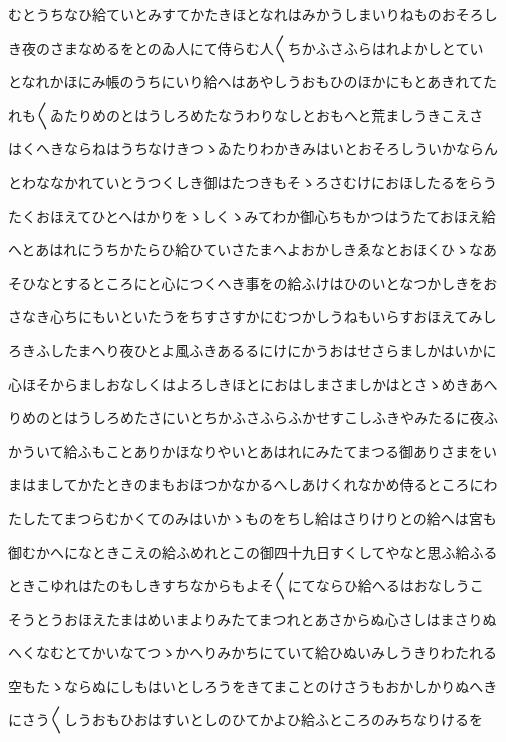 \documentclass[a4paper,11pt,landscape]{ltjtarticle}
\begin{document}
むとうちなひ給ていとみすてかたきほとなれはみかうしまいりねものおそろし
\par\medskip
き夜のさまなめるをとのゐ人にて侍らむ人〱ちかふさふらはれよかしとてい
\par\medskip
となれかほにみ帳のうちにいり給へはあやしうおもひのほかにもとあきれてた
\par\medskip
れも〱ゐたりめのとはうしろめたなうわりなしとおもへと荒ましうきこえさ
\par\medskip
はくへきならねはうちなけきつゝゐたりわかきみはいとおそろしういかならん
\par\medskip
とわななかれていとうつくしき御はたつきもそゝろさむけにおほしたるをらう
\par\medskip
たくおほえてひとへはかりをゝしくゝみてわか御心ちもかつはうたておほえ給
\par\medskip
へとあはれにうちかたらひ給ひていさたまへよおかしきゑなとおほくひゝなあ
\par\medskip
そひなとするところにと心につくへき事をの給ふけはひのいとなつかしきをお
\par\medskip
さなき心ちにもいといたうをちすさすかにむつかしうねもいらすおほえてみし
\par\medskip
ろきふしたまへり夜ひとよ風ふきあるるにけにかうおはせさらましかはいかに
\par\medskip
心ほそからましおなしくはよろしきほとにおはしまさましかはとさゝめきあへ
\par\medskip
りめのとはうしろめたさにいとちかふさふらふかせすこしふきやみたるに夜ふ
\par\medskip
かういて給ふもことありかほなりやいとあはれにみたてまつる御ありさまをい
\par\medskip
まはましてかたときのまもおほつかなかるへしあけくれなかめ侍るところにわ
\par\medskip
たしたてまつらむかくてのみはいかゝものをちし給はさりけりとの給へは宮も
\par\medskip
御むかへになときこえの給ふめれとこの御四十九日すくしてやなと思ふ給ふる
\par\medskip
ときこゆれはたのもしきすちなからもよそ〱にてならひ給へるはおなしうこ
\par\medskip
そうとうおほえたまはめいまよりみたてまつれとあさからぬ心さしはまさりぬ
\par\medskip
へくなむとてかいなてつゝかへりみかちにていて給ひぬいみしうきりわたれる
\par\medskip
空もたゝならぬにしもはいとしろうをきてまことのけさうもおかしかりぬへき
\par\medskip
にさう〱しうおもひおはすいとしのひてかよひ給ふところのみちなりけるを
\end{document}
